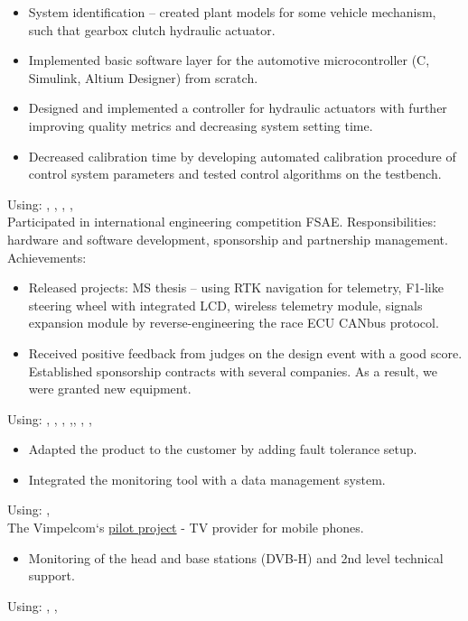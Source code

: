 \begin{itemize}
    \item System identification -- created plant models for some vehicle mechanism, such that gearbox clutch hydraulic actuator.
    \item Implemented basic software layer for the automotive microcontroller (C, Simulink, Altium Designer) from scratch.
    \item Designed and implemented a controller for hydraulic actuators with further improving quality metrics and decreasing system setting time.
    \item Decreased calibration time by developing automated calibration procedure of control system parameters and tested control algorithms on the testbench.
\end{itemize}
Using: , , , , 
\horizontalline
% 
 \\
Participated in international engineering competition FSAE.
Responsibilities: hardware and software development, sponsorship and partnership management.
Achievements:
\begin{itemize}
    \item Released projects: MS thesis -- using RTK navigation for telemetry, F1-like steering wheel with integrated LCD, wireless telemetry module, signals expansion module by reverse-engineering the race ECU CANbus protocol.
    \item Received positive feedback from judges on the design event with a good score. Established sponsorship contracts with several companies. As a result, we were granted new equipment.
\end{itemize}
Using: , , , ,, , , 
\horizontalline
% 
\begin{itemize}
    \item Adapted the product to the customer by adding fault tolerance setup.
    \item Integrated the monitoring tool with a data management system.
\end{itemize}
Using: , 
\horizontalline
% 
\\
The Vimpelcom`s \href{https://www.dvb.org/news/russia-to-launch-dvb-h-services}{pilot project} - TV provider for mobile phones.
\begin{itemize}
    \item Monitoring of the head and base stations (DVB-H) and 2nd level technical support.
\end{itemize}
Using: , , 

